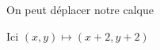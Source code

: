 \documentclass[preview]{standalone}
\begin{document}
\begin{center}
On peut déplacer notre calque

Ici $(x,y) \mapsto (x + 2, y + 2)$
\end{center}
\end{document}
